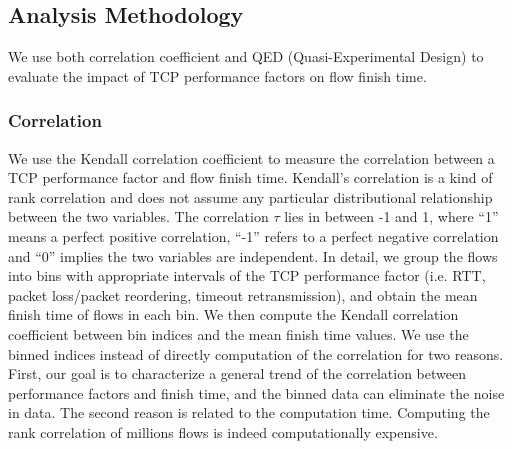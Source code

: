 \subsection{Analysis Methodology}

We use both correlation coefficient and QED (Quasi-Experimental Design) to evaluate the impact of TCP performance factors on flow finish time. %

\subsubsection{Correlation}


We use the Kendall correlation coefficient to measure the correlation between a TCP performance factor and flow finish time. Kendall's correlation is a kind of rank correlation and does not assume any particular distributional relationship between the two variables. The correlation $\tau$ lies in between -1 and 1, where ``1'' means a perfect positive correlation, ``-1'' refers to a perfect negative correlation and ``0'' implies the two variables are independent. In detail, we group the flows into bins with appropriate intervals of the TCP performance factor (i.e. RTT, packet loss/packet reordering, timeout retransmission), and obtain the mean finish time of flows in each bin. We then compute the Kendall correlation coefficient between bin indices and the mean finish time values. We use the binned indices instead of directly computation of the correlation for two reasons. First, our goal is to characterize a general trend of the correlation between performance factors and finish time, and the binned data can eliminate the noise in data. The second reason is related to the computation time. Computing the rank correlation of millions flows is indeed computationally expensive. 

